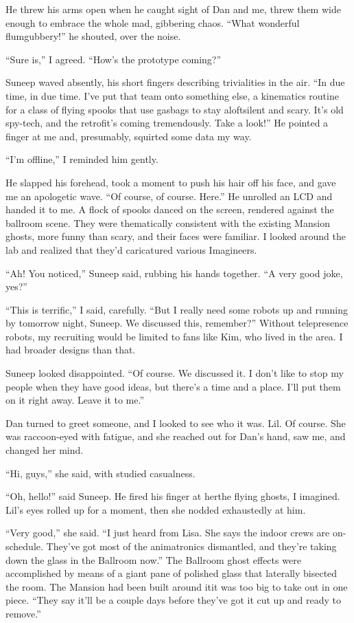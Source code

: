 He threw his arms open when he caught sight of Dan and me, threw
them wide enough to embrace the whole mad, gibbering chaos. “What
wonderful flumgubbery!” he shouted, over the noise.

“Sure is,” I agreed. “How's the prototype coming?”

Suneep waved absently, his short fingers describing trivialities in
the air. “In due time, in due time. I've put that team onto
something else, a kinematics routine for a class of flying spooks
that use gasbags to stay aloft{\dash}silent and scary. It's old spy-tech,
and the retrofit's coming tremendously. Take a look!” He pointed a
finger at me and, presumably, squirted some data my way.

“I'm offline,” I reminded him gently.

He slapped his forehead, took a moment to push his hair off his
face, and gave me an apologetic wave. “Of course, of course. Here.”
He unrolled an LCD and handed it to me. A flock of spooks danced on
the screen, rendered against the ballroom scene. They were
thematically consistent with the existing Mansion ghosts, more
funny than scary, and their faces were familiar. I looked around
the lab and realized that they'd caricatured various Imagineers.

“Ah! You noticed,” Suneep said, rubbing his hands together. “A very
good joke, yes?”

“This is terrific,” I said, carefully. “But I really need some
robots up and running by tomorrow night, Suneep. We discussed this,
remember?” Without telepresence robots, my recruiting would be
limited to fans like Kim, who lived in the area. I had broader
designs than that.

Suneep looked disappointed. “Of course. We discussed it. I don't
like to stop my people when they have good ideas, but there's a
time and a place. I'll put them on it right away. Leave it to me.”

Dan turned to greet someone, and I looked to see who it was. Lil.
Of course. She was raccoon-eyed with fatigue, and she reached out
for Dan's hand, saw me, and changed her mind.

“Hi, guys,” she said, with studied casualness.

“Oh, hello!” said Suneep. He fired his finger at her{\dash}the flying
ghosts, I imagined. Lil's eyes rolled up for a moment, then she
nodded exhaustedly at him.

“Very good,” she said. “I just heard from Lisa. She says the indoor
crews are on-schedule. They've got most of the animatronics
dismantled, and they're taking down the glass in the Ballroom now.”
The Ballroom ghost effects were accomplished by means of a giant
pane of polished glass that laterally bisected the room. The
Mansion had been built around it{\dash}it was too big to take out in one
piece. “They say it'll be a couple days before they've got it cut
up and ready to remove.”


